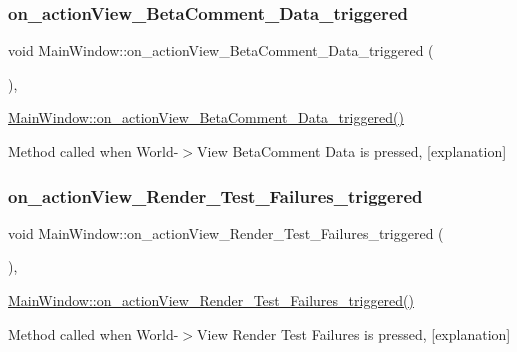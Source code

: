 \subsubsection{\texorpdfstring{on\+\_\+action\+View\+\_\+\+Beta\+Comment\+\_\+\+Data\+\_\+triggered}{on\_actionView\_BetaComment\_Data\_triggered}}
{\footnotesize\ttfamily void Main\+Window\+::on\+\_\+action\+View\+\_\+\+Beta\+Comment\+\_\+\+Data\+\_\+triggered (\begin{DoxyParamCaption}{ }\end{DoxyParamCaption})\hspace{0.3cm}{\ttfamily [private]}, {\ttfamily [slot]}}



\hyperlink{class_main_window_a18145ab0d7747c6315778992ea38615a}{Main\+Window\+::on\+\_\+action\+View\+\_\+\+Beta\+Comment\+\_\+\+Data\+\_\+triggered()} 

Method called when World-\/$>$View Beta\+Comment Data is pressed, \mbox{[}explanation\mbox{]} \mbox{\label{class_main_window_a0ffc9518de23f6fcc4b60286e5d70260}} 
\subsubsection{\texorpdfstring{on\+\_\+action\+View\+\_\+\+Render\+\_\+\+Test\+\_\+\+Failures\+\_\+triggered}{on\_actionView\_Render\_Test\_Failures\_triggered}}
{\footnotesize\ttfamily void Main\+Window\+::on\+\_\+action\+View\+\_\+\+Render\+\_\+\+Test\+\_\+\+Failures\+\_\+triggered (\begin{DoxyParamCaption}{ }\end{DoxyParamCaption})\hspace{0.3cm}{\ttfamily [private]}, {\ttfamily [slot]}}



\hyperlink{class_main_window_a0ffc9518de23f6fcc4b60286e5d70260}{Main\+Window\+::on\+\_\+action\+View\+\_\+\+Render\+\_\+\+Test\+\_\+\+Failures\+\_\+triggered()} 

Method called when World-\/$>$View Render Test Failures is pressed, \mbox{[}explanation\mbox{]} \mbox{\label{class_main_window_a018b6c693a863ad693ae5c5711e7e9a0}} 
